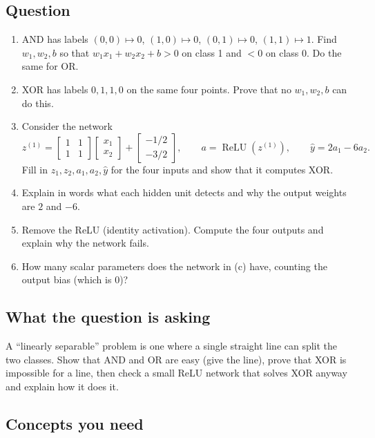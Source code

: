 \documentclass[12pt,a4paper]{article}
\newcommand{\relu}{\operatorname{ReLU}}
\newcommand{\hlq}[1]{{\setlength{\fboxsep}{1.5pt}\colorbox{yellow}{#1}}}
\begin{document}
\subsection*{Question}
\begin{enumerate}[label=(\alph*)]
\item[(a)] AND has labels $(0,0)\mapsto0$, $(1,0)\mapsto0$, $(0,1)\mapsto0$, $(1,1)\mapsto1$. Find $w_1,w_2,b$ so that $w_1x_1+w_2x_2+b>0$ on class 1 and $<0$ on class 0. Do the same for OR.
\item[\hlq{(b)}] XOR has labels $0,1,1,0$ on the same four points. Prove that no $w_1,w_2,b$ can do this.
\item[\hlq{(c)}] Consider the network
\[
z^{(1)}=\begin{bmatrix}1&1\\1&1\end{bmatrix}\begin{bmatrix}x_1\\x_2\end{bmatrix}+\begin{bmatrix}-1/2\\-3/2\end{bmatrix},\qquad a=\relu(z^{(1)}),\qquad \hat y=2a_1-6a_2 .
\]
Fill in $z_1,z_2,a_1,a_2,\hat y$ for the four inputs and show that it computes XOR.
\item[\hlq{(d)}] Explain in words what each hidden unit detects and why the output weights are $2$ and $-6$.
\item[(e)] Remove the ReLU (identity activation). Compute the four outputs and explain why the network fails.
\item[(f)] How many scalar parameters does the network in (c) have, counting the output bias (which is 0)?
\end{enumerate}

\subsection*{What the question is asking}
A ``linearly separable'' problem is one where a single straight line can split the two classes. Show that AND and OR are easy (give the line), prove that XOR is impossible for a line, then check a small ReLU network that solves XOR anyway and explain how it does it.

\subsection*{Concepts you need}
\end{document}
